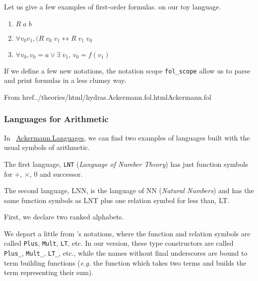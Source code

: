 Let us give a few examples of first-order formulas. on our toy language.

\label{fol:examplesf1f2f3}
\begin{enumerate}
\item $R\;a\;b$
\item $\forall v_0 v_1, (R\;v_0\;v_1 \leftrightarrow R\;v_1\;v_0$
\item $ \forall v_0, v_0=a \vee \exists\;v_1,\, v_0= f(v_1)$
\end{enumerate}



If we define a few new notations, the notation scope \texttt{fol\_scope} allow us to parse and print formulas in a less clumsy way.

From href{../theories/html/hydras.Ackermann.fol.html}{Ackermann.fol}




\begin{remark}
\end{remark}




\subsubsection{Languages for Arithmetic}






In ~\href{../theories/html/hydras.Ackermann.Languages.html}{Ackermann.Languages}, we can find two examples of languages built with the usual symbols of arithmetic.

The first language, \texttt{LNT} (\emph{Language of Number Theory}) has just function symbols for $+$, $\times$, $0$ and successor.




The second language, LNN, is the language of NN (\emph{Natural Numbers}) and has
the same function symbols as LNT plus one relation symbol for less than, LT.

First, we declare two ranked alphabets.

\begin{remark}
  We depart a little from \cite{Goedel}'s notations, where the 
function and relation symbols are called \texttt{Plus}, 
\texttt{Mult}, \texttt{LT}, etc. In our version, these type constructors are called \texttt{Plus\_}, 
\texttt{Mult\_}, \texttt{LT\_}, etc., while the names without final underscores are bound to term building functions (\emph{e.g.}
the function which takes two terms and builds the term representing their sum).
\end{remark}



